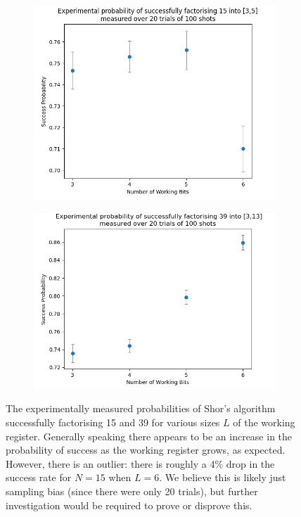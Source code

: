 \documentclass{article}[11pt]
\begin{document}
\begin{figure}[H]
    \centering
\begin{subfigure}[t]{0.48\textwidth}
    \centering
    \includegraphics[width=\linewidth]{Pictures/Shor Factor 15/shor factor 15 bitsize test.png}
\end{subfigure}%
\begin{subfigure}[t]{0.52\textwidth}
    \centering
    \includegraphics[width=\linewidth]{Pictures/Shor Factor 15/shor_39_factor_graph.png}
\end{subfigure}
\caption{The experimentally measured probabilities of Shor's algorithm successfully factorising 15 and 39 for various sizes $L$ of the working register. Generally speaking there appears to be an increase in the probability of success as the working register grows, as expected. However, there is an outlier: there is roughly a 4\% drop in the success rate for $N=15$ when $L=6$. We believe this is likely just sampling bias (since there were only 20 trials), but further investigation would be required to prove or disprove this.}
\label{fig:factortest}
\end{figure}
\end{document}
